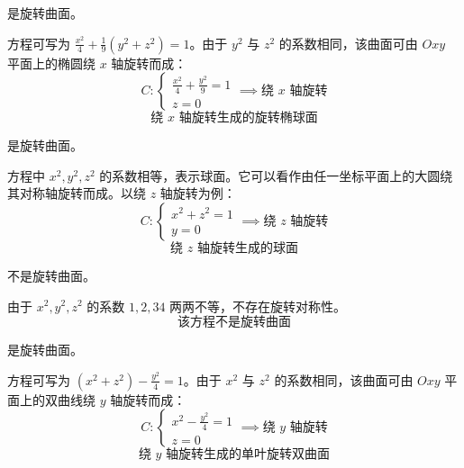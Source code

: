 \begin{solution}
     是旋转曲面。

    方程可写为 $\frac{x^2}{4} + \frac{1}{9}(y^2 + z^2) = 1$。由于 $y^2$ 与 $z^2$ 的系数相同，该曲面可由 $Oxy$ 平面上的椭圆绕 $x$ 轴旋转而成：
    \begin{equation}
        C: \begin{cases} \frac{x^2}{4} + \frac{y^2}{9} = 1 \\ z = 0 \end{cases} \implies \text{绕 } x \text{ 轴旋转}
    \end{equation}
    \begin{equation}
        \boxed{\text{绕 } x \text{ 轴旋转生成的旋转椭球面}}
    \end{equation}

     是旋转曲面。

    方程中 $x^2, y^2, z^2$ 的系数相等，表示球面。它可以看作由任一坐标平面上的大圆绕其对称轴旋转而成。以绕 $z$ 轴旋转为例：
    \begin{equation}
        C: \begin{cases} x^2 + z^2 = 1 \\ y = 0 \end{cases} \implies \text{绕 } z \text{ 轴旋转}
    \end{equation}
    \begin{equation}
        \boxed{\text{绕 } z \text{ 轴旋转生成的球面}}
    \end{equation}

     不是旋转曲面。

    由于 $x^2, y^2, z^2$ 的系数 $1, 2, 34$ 两两不等，不存在旋转对称性。
    \begin{equation}
        \boxed{\text{该方程不是旋转曲面}}
    \end{equation}

     是旋转曲面。

    方程可写为 $(x^2 + z^2) - \frac{y^2}{4} = 1$。由于 $x^2$ 与 $z^2$ 的系数相同，该曲面可由 $Oxy$ 平面上的双曲线绕 $y$ 轴旋转而成：
    \begin{equation}
        C: \begin{cases} x^2 - \frac{y^2}{4} = 1 \\ z = 0 \end{cases} \implies \text{绕 } y \text{ 轴旋转}
    \end{equation}
    \begin{equation}
        \boxed{\text{绕 } y \text{ 轴旋转生成的单叶旋转双曲面}}
    \end{equation}


\end{solution}
